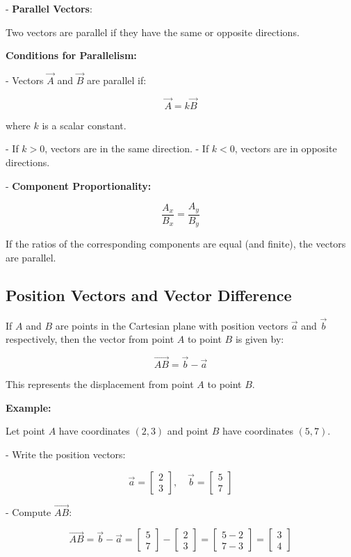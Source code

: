 \documentclass{article}
\begin{document}
\begin{multicols}{2}
- \textbf{Parallel Vectors}:

  Two vectors are parallel if they have the same or opposite directions.

  \textbf{Conditions for Parallelism:}

  - Vectors \(\vec{A}\) and \(\vec{B}\) are parallel if:

    \[
    \vec{A} = k \vec{B}
    \]

    where \( k \) is a scalar constant.

    - If \( k > 0 \), vectors are in the same direction.
    - If \( k < 0 \), vectors are in opposite directions.

  - \textbf{Component Proportionality:}

    \[
    \frac{A_x}{B_x} = \frac{A_y}{B_y}
    \]

    If the ratios of the corresponding components are equal (and finite), the vectors are parallel.

\subsection*{Position Vectors and Vector Difference}

If \( A \) and \( B \) are points in the Cartesian plane with position vectors \( \vec{a} \) and \( \vec{b} \) respectively, then the vector from point \( A \) to point \( B \) is given by:

\[
\vec{AB} = \vec{b} - \vec{a}
\]

This represents the displacement from point \( A \) to point \( B \).

\textbf{Example:}

Let point \( A \) have coordinates \( (2, 3) \) and point \( B \) have coordinates \( (5, 7) \).

- Write the position vectors:

  \[
  \vec{a} = \begin{bmatrix} 2 \\ 3 \end{bmatrix}, \quad \vec{b} = \begin{bmatrix} 5 \\ 7 \end{bmatrix}
  \]

- Compute \( \vec{AB} \):

  \[
  \vec{AB} = \vec{b} - \vec{a} = \begin{bmatrix} 5 \\ 7 \end{bmatrix} - \begin{bmatrix} 2 \\ 3 \end{bmatrix} = \begin{bmatrix} 5 - 2 \\ 7 - 3 \end{bmatrix} = \begin{bmatrix} 3 \\ 4 \end{bmatrix}
  \]


\end{multicols}
\end{document}
